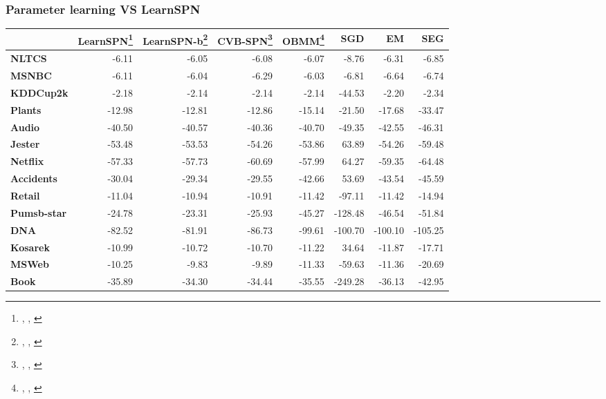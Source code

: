 \documentclass[10pt, t, xcolor={usenames,dvipsnames,svgnames}, compress]{beamer}
\newcommand{\customcite}[1]{\footnote{\scriptsize \citeauthor{#1}, \citetitle{#1}, \citeyear{#1}}}
\begin{document}
\begin{frame}[t]
  \frametitle{Parameter learning VS LearnSPN}
  \vspace{-10pt}
  \begin{table}
    \centering
    \scriptsize
    \setlength{\tabcolsep}{3pt}  
    \begin{tabular}{l r r r r r r r}
      \toprule
      & \textsf{LearnSPN}\customcite{Gens2013} &
                                                 \textsf{LearnSPN-b}\customcite{Vergari2015} & \textsf{CVB-SPN}\customcite{Zhao2016a} & \textsf{OBMM}\customcite{Rashwan2016} & \textsf{SGD}\footnotemark[52] & \textsf{EM}\footnotemark[52] & \textsf{SEG}\footnotemark[52] \\
      \midrule
      \textbf{NLTCS}      & -6.11   & -6.05   & -6.08   & -6.07   & -8.76   & -6.31   & -6.85   \\
      \textbf{MSNBC}      & -6.11   & -6.04   & -6.29   & -6.03   & -6.81   & -6.64   & -6.74   \\
      \textbf{KDDCup2k}   & -2.18   & -2.14   & -2.14   & -2.14   & -44.53  & -2.20   & -2.34   \\
      \textbf{Plants}     & -12.98  & -12.81  & -12.86  & -15.14  & -21.50  & -17.68  & -33.47  \\
      \textbf{Audio}      & -40.50  & -40.57  & -40.36  & -40.70  & -49.35  & -42.55  & -46.31  \\
      \textbf{Jester}     & -53.48  & -53.53  & -54.26  & -53.86  & 63.89   & -54.26  & -59.48  \\
      \textbf{Netflix}    & -57.33  & -57.73  & -60.69  & -57.99  & 64.27   & -59.35  & -64.48  \\
      \textbf{Accidents}  & -30.04  & -29.34  & -29.55  & -42.66  & 53.69   & -43.54  & -45.59  \\
      \textbf{Retail}     & -11.04  & -10.94  & -10.91  & -11.42  & -97.11  & -11.42  & -14.94  \\
      \textbf{Pumsb-star} & -24.78  & -23.31  & -25.93  & -45.27  & -128.48 & -46.54  & -51.84  \\
      \textbf{DNA}        & -82.52  & -81.91  & -86.73  & -99.61  & -100.70 & -100.10 & -105.25 \\
      \textbf{Kosarek}    & -10.99  & -10.72  & -10.70  & -11.22  & 34.64   & -11.87  & -17.71  \\
      \textbf{MSWeb}      & -10.25  & -9.83   & -9.89   & -11.33  & -59.63  & -11.36  & -20.69  \\
      \textbf{Book}       & -35.89  & -34.30  & -34.44  & -35.55  & -249.28 & -36.13  & -42.95  \\

\end{tabular}
\end{table}
\end{frame}
\end{document}

